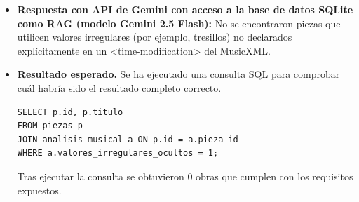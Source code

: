 \begin{itemize}
1. **Tresillos**: Estos se indican utilizando el atributo `numerator` y `denominator` del elemento `<note>` o `<rest>`. Por ejemplo, `<note numerator=""3"" denominator=""4"">...</note>`.
2. **Cuartillos**: Similar a los tresillos, pero con un numerador de 1.
3. **Semicolones**: Un semicóndemoso es la mitad de una cola.

Estas piezas se pueden indicar mediante el uso de números y símbolos musicales en lugar de utilizar explícitamente un `<time-modification>`. Por ejemplo, en lugar de `<note numerator=""3"" denominator=""4"">...</note>`, simplemente puedes escribir `<note num=""3/4"">...</note>`.

Es importante tener en cuenta que la forma más común de indicar estos valores irregulares es utilizando un `<time-modification>`. Sin embargo, también se pueden utilizar los métodos anteriores para lograr el mismo resultado."
    \item \textbf{Respuesta con API de Gemini con acceso a la base de datos SQLite como RAG (modelo Gemini 2.5 Flash):} No se encontraron piezas que utilicen valores irregulares (por ejemplo, tresillos) no declarados explícitamente en un <time-modification> del MusicXML.
    \item \textbf{Resultado esperado.} Se ha ejecutado una consulta SQL para comprobar cuál habría sido el resultado completo correcto.
    \begin{verbatim}
SELECT p.id, p.titulo
FROM piezas p
JOIN analisis_musical a ON p.id = a.pieza_id
WHERE a.valores_irregulares_ocultos = 1;
    \end{verbatim}    
    Tras ejecutar la consulta se obtuvieron 0 obras que cumplen con los requisitos expuestos.



\end{itemize}

